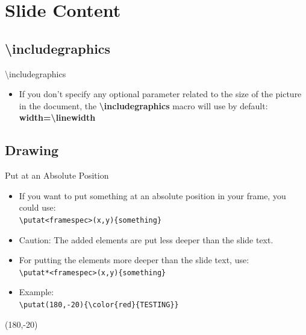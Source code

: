\documentclass[english,sectioncirclenumberstyle]{ciadbeamer}
\begin{document}
\section{Slide Content}
\sectiontableofcontentslide

\subsection{{\textbackslash}includegraphics}
\subsectiontableofcontentslide

\begin{frame}{{\textbackslash}includegraphics}
	\begin{itemize}
	\vspace{2em}
	\item If you don't specify any optional parameter related to the size of the picture in the document, the \textbf{{\textbackslash}includegraphics} macro will use by default: \\
		\textbf{width={\textbackslash}linewidth}
	\end{itemize}
\end{frame}

\subsection{Drawing}
\subsectiontableofcontentslide

\begin{frame}{Put at an Absolute Position}
	\begin{itemize}
	\item If you want to put something at an absolute position in your frame, you could use: \\
		\texttt{{\textbackslash}putat<framespec>(x,y)\{something\}}
	\item \alert{Caution: The added elements are put less deeper than the slide text.}
	\item For putting the elements more deeper than the slide text, use: \\
		\texttt{{\textbackslash}putat*<framespec>(x,y)\{something\}}
	\vspace{1em}
	\item Example: \\
		\texttt{{\textbackslash}putat(180,-20)\{{\textbackslash}color\{red\}\{TESTING\}\}}
	\end{itemize}
	\putat(180,-20){\color{red}{TESTING}}
\end{frame}
\end{document}
